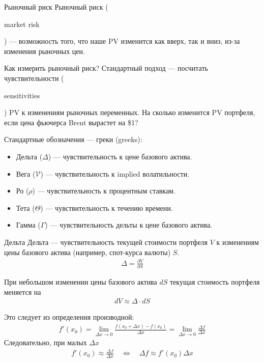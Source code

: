 \documentclass{beamer}
\newcommand{\en}[1]{\begin{otherlanguage}{english}#1\end{otherlanguage}}
\begin{document}
\begin{frame}{Рыночный риск}
\justify
\alert{Рыночный риск} (\en{market risk}) --- возможность того, что наше PV изменится как вверх, так и вниз, из-за изменения рыночных цен.

\justify
Как измерить рыночный риск? Стандартный подход --- посчитать чувствительности (\en{sensitivities}) PV к изменениям рыночных переменных. На сколько изменится PV портфеля, если цена фьючерса Brent вырастет на \$1?

\justify
Стандартные обозначения --- греки (greeks):
\begin{itemize}
\item Дельта ($\Delta$) --- чувствительность к цене базового актива.
\item Вега ($\mathcal{V}$) --- чувствительность к implied волатильности.
\item Ро ($\rho$) --- чувствительность к процентным ставкам.
\item Тета ($\Theta$) --- чувствительность к течению времени.
\item Гамма ($\Gamma$) --- чувствительность дельты к цене базового актива.
\end{itemize}
\end{frame}



\begin{frame}{Дельта}
\justify
Дельта --- чувствительность текущей стоимости портфеля $V$ к изменениям цены базового актива (например, спот-курса валюты) $S$. 
\begin{align*}
\Delta = \frac{\partial V}{\partial S}
\end{align*}

\justify
При небольшом изменении цены базового актива $dS$ текущая стоимость портфеля меняется на
\begin{align*}
dV \approx \Delta\cdot dS
\end{align*}

\justify
Это следует из определения производной:
\begin{align*}
f'(x_0) = \lim_{\Delta x \to 0} \frac{f(x_0+\Delta x) - f(x_0)}{\Delta x} = \lim_{\Delta x \to 0} \frac{\Delta f}{\Delta x}
\end{align*}
Следовательно, при малых $\Delta x$
\begin{align*}
f'(x_0) \approx \frac{\Delta f}{\Delta x} \quad \Leftrightarrow \quad \Delta f \approx f'(x_0)\Delta x
\end{align*}
\end{frame}
\end{document}
